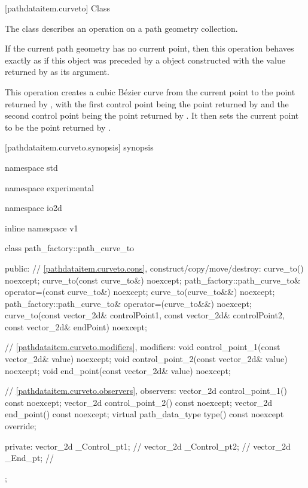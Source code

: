  [pathdataitem.curveto] {Class }

\pnum
{}
The class  describes an operation on a path geometry collection.

\pnum
If the current path geometry has no current point, then this operation behaves exactly as if this object was preceded by a  object constructed with the value returned by  as its argument.

\pnum
This operation creates a cubic B\'ezier curve from the current point to the point returned by , with the first control point being the point returned by  and the second control point being the point returned by . It then sets the current point to be the point returned by .

 [pathdataitem.curveto.synopsis] { synopsis}

\begin{codeblock}
namespace std { namespace experimental { namespace io2d { inline namespace v1 {
  class path_factory::path_curve_to {
  public:
    // \ref{pathdataitem.curveto.cons}, construct/copy/move/destroy:
    curve_to() noexcept;
    curve_to(const curve_to&) noexcept;
    path_factory::path_curve_to& operator=(const curve_to&) noexcept;
    curve_to(curve_to&&) noexcept;
    path_factory::path_curve_to& operator=(curve_to&&) noexcept;
    curve_to(const vector_2d& controlPoint1, const vector_2d& controlPoint2,
      const vector_2d& endPoint) noexcept;

    // \ref{pathdataitem.curveto.modifiers}, modifiers:
    void control_point_1(const vector_2d& value) noexcept;
    void control_point_2(const vector_2d& value) noexcept;
    void end_point(const vector_2d& value) noexcept;


    // \ref{pathdataitem.curveto.observers}, observers:
    vector_2d control_point_1() const noexcept;
    vector_2d control_point_2() const noexcept;
    vector_2d end_point() const noexcept;
    virtual path_data_type type() const noexcept override;
    
  private:
    vector_2d _Control_pt1; // \expos
    vector_2d _Control_pt2; // \expos
    vector_2d _End_pt;      // \expos
  };
} } } }
\end{codeblock}

